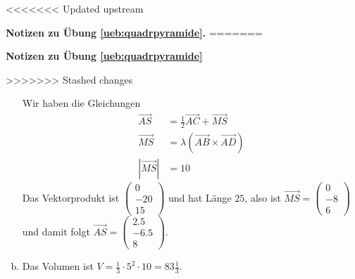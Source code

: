 \documentclass[%
11pt,%
twoside,%
titlepage,%
<<<<<<< Updated upstream
german,%
=======
swissgerman,%
>>>>>>> Stashed changes
headsepline%
]{scrartcl}
\newcommand{\faReturnGray}{\textcolor{gray}{\faMailReply}} %
\theoremstyle{definition}
\theoremstyle{plain}
\newcommand{\concatueb}[1]{ueb:#1}%
\newcommand{\concatlsg}[1]{lsg:#1}%
\newenvironment{lsg}[1]{%
<<<<<<< Updated upstream
    \par\noindent\textbf{Notizen zu Übung \ref{\concatueb{#1}}.}%
    \label{\concatlsg{#1}}
=======
    \par\noindent\textbf{Notizen zu Übung \ref{\concatueb{#1}}}\label{\concatlsg{#1}}
    \hfill\hyperref[\concatueb{#1}]{\faReturnGray}\par %
>>>>>>> Stashed changes
}{%
    \par%
}
\begin{document}
\begin{lsg}{quadrpyramide}
\begin{enumerate}[a)]
        Wir haben die Gleichungen
        \begin{align*}
            \vec{AS} &=\frac{1}{2}\vec{AC}+\vec{MS}\\
            \vec{MS} &= \lambda(\vec{AB}\times\vec{AD})\\
            |\vec{MS}| &= 10
        \end{align*}
        Das Vektorprodukt ist $\begin{pmatrix}
            0\\-20\\15
        \end{pmatrix}$ und hat Länge $25$, also ist $\vec{MS}=\begin{pmatrix}
            0\\-8\\6
        \end{pmatrix}$ und damit folgt $\vec{AS}=\begin{pmatrix}
            2.5\\-6.5\\8
        \end{pmatrix}$.

        \item Das Volumen ist $V=\frac{1}{3}\cdot 5^2\cdot10=83\frac{1}{3}$.
    \end{enumerate}
\end{lsg}
\end{document}

